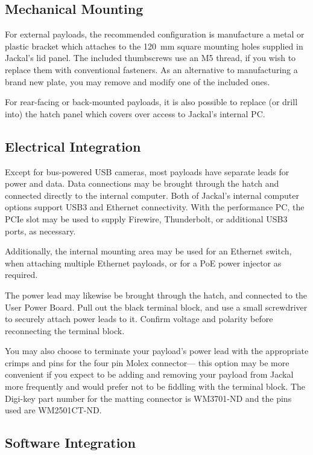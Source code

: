 \documentclass[]{clearpath-latex/clearpath-manual}
\begin{document}

\subsection{Mechanical Mounting}

For external payloads, the recommended configuration is manufacture a metal or plastic bracket
which attaches to the \SI{120}{\mm} square mounting holes supplied in Jackal's lid
panel. The included thumbscrews use an M5 thread, if you wish to replace them with conventional
fasteners. As an alternative to manufacturing a brand new plate, you may remove and modify one
of the included ones.

For rear-facing or back-mounted payloads, it is also possible to replace (or drill into) the
hatch panel which covers over access to Jackal's internal PC.

\subsection{Electrical Integration}\label{payload-elec}

Except for bus-powered USB cameras, most payloads have separate leads for power and data. Data
connections may be brought through the hatch and connected directly to the internal computer. Both
of Jackal's internal computer options support USB3 and Ethernet connectivity. With the performance
PC, the PCIe slot may be used to supply Firewire, Thunderbolt, or additional USB3 ports, as necessary.

Additionally, the internal mounting area may be used for an Ethernet switch, when attaching multiple
Ethernet payloads, or for a PoE power injector as required.

The power lead may likewise be brought through the hatch, and connected to the User Power Board. Pull
out the black terminal block, and use a small screwdriver to securely attach power leads to it.
Confirm voltage and polarity before reconnecting the terminal block.

You may also choose to terminate your payload's power lead with the appropriate crimps and pins
for the four pin Molex connector--- this option may be more convenient if you expect to be adding
and removing your payload from Jackal more frequently and would prefer not to be fiddling with the
terminal block. The Digi-key part number for the matting connector is WM3701-ND and the pins used are WM2501CT-ND.


\subsection{Software Integration}
\end{document}
